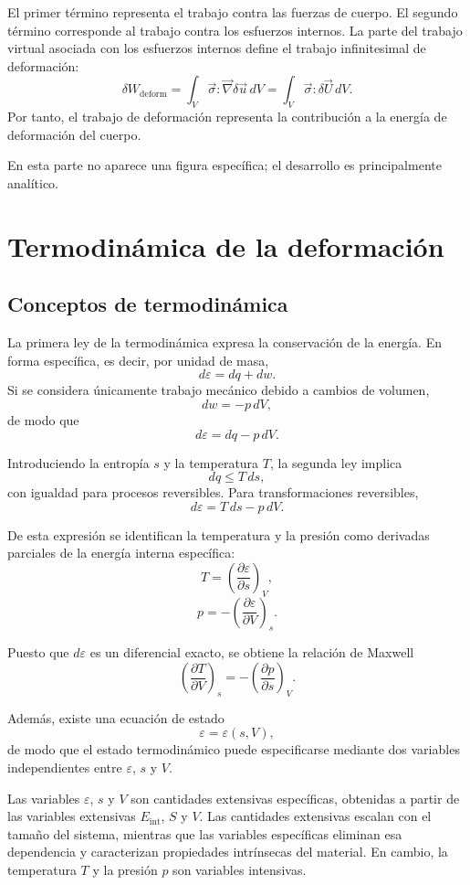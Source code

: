 El primer término representa el trabajo contra las fuerzas de cuerpo. El segundo término corresponde al trabajo contra los esfuerzos internos. La parte del trabajo virtual asociada con los esfuerzos internos define el trabajo infinitesimal de deformación:
$$ \delta W_{\mathrm{deform}} = \int_V \vec{\sigma}:\vec{\nabla}\delta\vec{u}\,dV = \int_V \vec{\sigma}:\delta\vec{U}\,dV. $$
Por tanto, el trabajo de deformación representa la contribución a la energía de deformación del cuerpo.

En esta parte no aparece una figura específica; el desarrollo es principalmente analítico.

\section{Termodinámica de la deformación}

\subsection{Conceptos de termodinámica}

La primera ley de la termodinámica expresa la conservación de la energía. En forma específica, es decir, por unidad de masa,
$$ d\varepsilon = dq + dw. $$
Si se considera únicamente trabajo mecánico debido a cambios de volumen,
$$ dw = -p\,dV, $$
de modo que
$$ d\varepsilon = dq - p\,dV. $$

Introduciendo la entropía $s$ y la temperatura $T$, la segunda ley implica
$$ dq \leq T\,ds, $$
con igualdad para procesos reversibles. Para transformaciones reversibles,
$$ d\varepsilon = T\,ds - p\,dV. $$

De esta expresión se identifican la temperatura y la presión como derivadas parciales de la energía interna específica:
$$ T = \left(\frac{\partial \varepsilon}{\partial s}\right)_V, $$
$$ p = -\left(\frac{\partial \varepsilon}{\partial V}\right)_s. $$

Puesto que $d\varepsilon$ es un diferencial exacto, se obtiene la relación de Maxwell
$$ \left(\frac{\partial T}{\partial V}\right)_s = -\left(\frac{\partial p}{\partial s}\right)_V. $$

Además, existe una ecuación de estado
$$ \varepsilon = \varepsilon(s,V), $$
de modo que el estado termodinámico puede especificarse mediante dos variables independientes entre $\varepsilon$, $s$ y $V$.

Las variables $\varepsilon$, $s$ y $V$ son cantidades extensivas específicas, obtenidas a partir de las variables extensivas $E_{\mathrm{int}}$, $S$ y $V$. Las cantidades extensivas escalan con el tamaño del sistema, mientras que las variables específicas eliminan esa dependencia y caracterizan propiedades intrínsecas del material. En cambio, la temperatura $T$ y la presión $p$ son variables intensivas.

